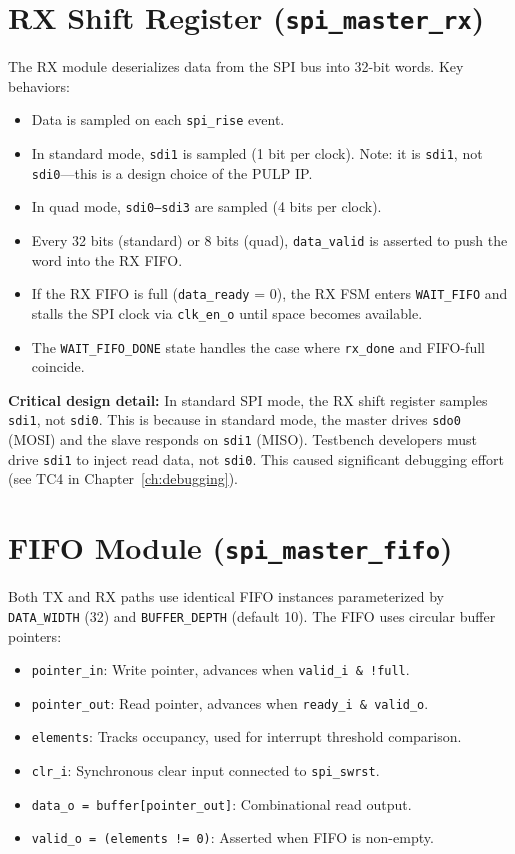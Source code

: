 \section{RX Shift Register (\texttt{spi\_master\_rx})}

The RX module deserializes data from the SPI bus into 32-bit words. Key behaviors:
\begin{itemize}[leftmargin=2em]
  \item Data is sampled on each \texttt{spi\_rise} event.
  \item In standard mode, \texttt{sdi1} is sampled (1 bit per clock). Note: it is \texttt{sdi1},
        not \texttt{sdi0}---this is a design choice of the PULP IP.
  \item In quad mode, \texttt{sdi0--sdi3} are sampled (4 bits per clock).
  \item Every 32 bits (standard) or 8 bits (quad), \texttt{data\_valid} is asserted to push the
        word into the RX FIFO.
  \item If the RX FIFO is full (\texttt{data\_ready} = 0), the RX FSM enters \texttt{WAIT\_FIFO}
        and stalls the SPI clock via \texttt{clk\_en\_o} until space becomes available.
  \item The \texttt{WAIT\_FIFO\_DONE} state handles the case where \texttt{rx\_done} and
        FIFO-full coincide.
\end{itemize}

\textbf{Critical design detail:} In standard SPI mode, the RX shift register samples
\texttt{sdi1}, not \texttt{sdi0}. This is because in standard mode, the master drives
\texttt{sdo0} (MOSI) and the slave responds on \texttt{sdi1} (MISO). Testbench developers
must drive \texttt{sdi1} to inject read data, not \texttt{sdi0}. This caused significant
debugging effort (see TC4 in Chapter~\ref{ch:debugging}).

\section{FIFO Module (\texttt{spi\_master\_fifo})}

Both TX and RX paths use identical FIFO instances parameterized by \texttt{DATA\_WIDTH} (32) and
\texttt{BUFFER\_DEPTH} (default 10). The FIFO uses circular buffer pointers:

\begin{itemize}[leftmargin=2em]
  \item \texttt{pointer\_in}: Write pointer, advances when \texttt{valid\_i \& !full}.
  \item \texttt{pointer\_out}: Read pointer, advances when \texttt{ready\_i \& valid\_o}.
  \item \texttt{elements}: Tracks occupancy, used for interrupt threshold comparison.
  \item \texttt{clr\_i}: Synchronous clear input connected to \texttt{spi\_swrst}.
  \item \texttt{data\_o = buffer[pointer\_out]}: Combinational read output.
  \item \texttt{valid\_o = (elements != 0)}: Asserted when FIFO is non-empty.
\end{itemize}

